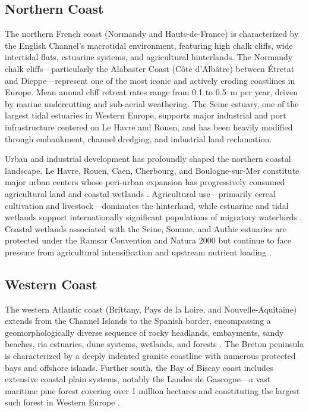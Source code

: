 \documentclass[remotesensing,article,submit,pdftex,moreauthors]{Definitions/mdpi}
\begin{document}
\subsection{Northern Coast}

The northern French coast (Normandy and Hauts-de-France) is characterized by the English Channel's macrotidal environment, featuring high chalk cliffs, wide intertidal flats, estuarine systems, and agricultural hinterlands. The Normandy chalk cliffs—particularly the Alabaster Coast (C\^ote d'Alb\^atre) between Étretat and Dieppe—represent one of the most iconic and actively eroding coastlines in Europe. Mean annual cliff retreat rates range from 0.1 to 0.5~m per year, driven by marine undercutting and sub-aerial weathering. The Seine estuary, one of the largest tidal estuaries in Western Europe, supports major industrial and port infrastructure centered on Le Havre and Rouen, and has been heavily modified through embankment, channel dredging, and industrial land reclamation.

Urban and industrial development has profoundly shaped the northern coastal landscape. Le Havre, Rouen, Caen, Cherbourg, and Boulogne-sur-Mer constitute major urban centers whose peri-urban expansion has progressively consumed agricultural land and coastal wetlands \citep{dauvin2011estuaire}. Agricultural use—primarily cereal cultivation and livestock—dominates the hinterland, while estuarine and tidal wetlands support internationally significant populations of migratory waterbirds \citep{femenias2011estuaire}. Coastal wetlands associated with the Seine, Somme, and Authie estuaries are protected under the Ramsar Convention and Natura 2000 but continue to face pressure from agricultural intensification and upstream nutrient loading \citep{dauvin2011estuaire,billen2007piren}.

\subsection{Western Coast}

The western Atlantic coast (Brittany, Pays de la Loire, and Nouvelle-Aquitaine) extends from the Channel Islands to the Spanish border, encompassing a geomorphologically diverse sequence of rocky headlands, embayments, sandy beaches, ria estuaries, dune systems, wetlands, and forests \citep{paskoff2001geomorphologie}. The Breton peninsula is characterized by a deeply indented granite coastline with numerous protected bays and offshore islands. Further south, the Bay of Biscay coast includes extensive coastal plain systems, notably the Landes de Gascogne—a vast maritime pine forest covering over 1 million hectares and constituting the largest such forest in Western Europe \citep{augustin2008landes}.
\end{document}
